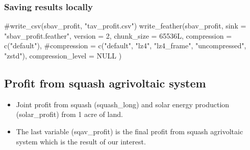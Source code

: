 \documentclass[
  letterpaper,
  DIV=11,
  numbers=noendperiod]{scrartcl}
\newenvironment{Shaded}{\begin{snugshade}}{\end{snugshade}}
\newcommand{\AttributeTok}[1]{\textcolor[rgb]{0.40,0.45,0.13}{#1}}
\newcommand{\CommentTok}[1]{\textcolor[rgb]{0.37,0.37,0.37}{#1}}
\newcommand{\ConstantTok}[1]{\textcolor[rgb]{0.56,0.35,0.01}{#1}}
\newcommand{\DecValTok}[1]{\textcolor[rgb]{0.68,0.00,0.00}{#1}}
\newcommand{\FunctionTok}[1]{\textcolor[rgb]{0.28,0.35,0.67}{#1}}
\newcommand{\NormalTok}[1]{\textcolor[rgb]{0.00,0.23,0.31}{#1}}
\newcommand{\StringTok}[1]{\textcolor[rgb]{0.13,0.47,0.30}{#1}}
\providecommand{\tightlist}{%
  \setlength{\itemsep}{0pt}\setlength{\parskip}{0pt}}\usepackage{longtable,booktabs,array}
\begin{document}
\subsubsection{Saving results locally}\label{saving-results-locally-1}

\begin{Shaded}
\begin{Highlighting}[]
\CommentTok{\#write\_csv(sbav\_profit, "tav\_profit.csv")}
\FunctionTok{write\_feather}\NormalTok{(sbav\_profit,}
  \AttributeTok{sink =} \StringTok{"sbav\_profit.feather"}\NormalTok{,}
  \AttributeTok{version =} \DecValTok{2}\NormalTok{,}
  \AttributeTok{chunk\_size =} \DecValTok{65536}\NormalTok{L,}
  \AttributeTok{compression =} \FunctionTok{c}\NormalTok{(}\StringTok{"default"}\NormalTok{),}
  \CommentTok{\#compression = c("default", "lz4", "lz4\_frame", "uncompressed", "zstd"),}
  \AttributeTok{compression\_level =} \ConstantTok{NULL}
\NormalTok{)}
\end{Highlighting}
\end{Shaded}

\subsection{Profit from squash agrivoltaic
system}\label{profit-from-squash-agrivoltaic-system}

\begin{itemize}
\tightlist
\item
  Joint profit from squash (squash\_long) and solar energy production
  (solar\_profit) from 1 acre of land.
\item
  The last variable (sqav\_profit) is the final profit from squash
  agrivoltaic system which is the result of our interest.
\end{itemize}
\end{document}
